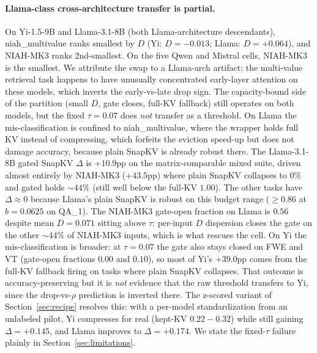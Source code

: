 \paragraph{Llama-class cross-architecture transfer is partial.} On
Yi-1.5-9B and Llama-3.1-8B (both Llama-architecture descendants),
niah\_multivalue ranks smallest by $D$ (Yi: $D = -0.013$; Llama: $D =
+0.064$), and NIAH-MK3 ranks 2nd-smallest. On the five Qwen and
Mistral cells, NIAH-MK3 is the smallest. We attribute the swap to a
Llama-arch artifact: the multi-value retrieval task happens to have
unusually concentrated early-layer attention on these models, which
inverts the early-vs-late drop sign. The capacity-bound side of the
partition (small $D$, gate closes, full-KV fallback) still operates on
both models, but the fixed $\tau = 0.07$ does \emph{not} transfer as a
threshold. On Llama the mis-classification is confined to
niah\_multivalue, where the wrapper holds full KV instead of
compressing, which forfeits the eviction speed-up but does not damage
accuracy, because plain SnapKV is already robust there. The
Llama-3.1-8B gated SnapKV $\Delta$ is $+10.9$pp on the
matrix-comparable mixed suite, driven almost entirely by NIAH-MK3
($+43.5$pp) where plain SnapKV collapses to $0\%$ and gated holds
$\sim 44\%$ (still well below the full-KV $1.00$). The other tasks
have $\Delta \approx 0$ because Llama's plain SnapKV is robust on this
budget range ($\geq 0.86$ at $b = 0.0625$ on QA\_1). The NIAH-MK3
gate-open fraction on Llama is $0.56$ despite mean $D = 0.071$ sitting
above $\tau$: per-input $D$ dispersion closes the gate on the other
$\sim 44\%$ of NIAH-MK3 inputs, which is what rescues the cell. On Yi
the mis-classification is broader: at $\tau = 0.07$ the gate also
stays closed on FWE and VT (gate-open fractions $0.00$ and $0.10$), so
most of Yi's $+39.0$pp comes from the full-KV fallback firing on tasks
where plain SnapKV collapses. That outcome is accuracy-preserving but
it is \emph{not} evidence that the raw threshold transfers to Yi, since the
drop-vs-$\rho$ prediction is inverted there. The z-scored variant of
Section~\ref{sec:recipe} resolves this: with a per-model standardization
from an unlabeled pilot, Yi compresses for real (kept-KV
$0.22 - 0.32$) while still gaining $\Delta = +0.145$, and Llama
improves to $\Delta = +0.174$. We state the fixed-$\tau$ failure
plainly in Section~\ref{sec:limitations}.

